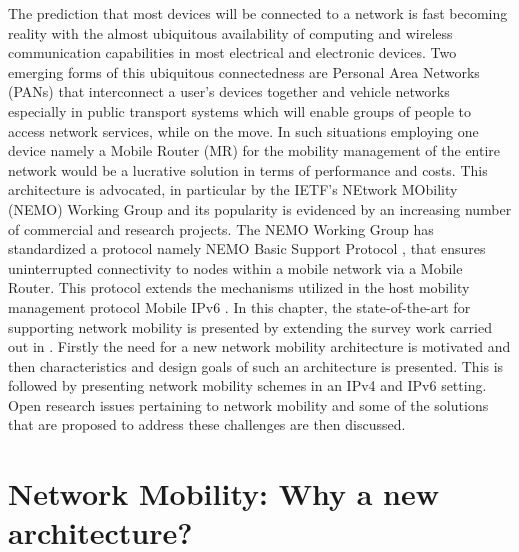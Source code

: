 The prediction that most devices will be connected to a network is fast
becoming reality with the almost ubiquitous availability of computing and
wireless communication capabilities in most electrical and electronic devices.
Two emerging forms of this ubiquitous connectedness are Personal Area Networks
(PANs) that interconnect a user's devices together and vehicle networks
especially in public transport systems which will enable groups of people to
access network services, while on the move. In such situations employing one
device namely a Mobile Router (MR) \cite{1} for the mobility management of the entire
network would be a lucrative solution in terms of performance and costs. This
architecture is advocated, in particular by the IETF's NEtwork MObility (NEMO)
Working Group \cite{2} and its popularity is evidenced by an increasing number of
commercial and research projects. The NEMO Working Group has standardized a
protocol namely NEMO Basic Support Protocol \cite{3}, that ensures uninterrupted
connectivity to nodes within a mobile network via a Mobile Router. This
protocol extends the mechanisms utilized in the host mobility management
protocol Mobile IPv6 \cite{4}.
In this chapter, the state-of-the-art for supporting network mobility is
presented by extending the survey work carried out in \cite{5}. Firstly the need for
a new network mobility architecture is motivated and then characteristics and
design goals of such an architecture is presented. This is followed by
presenting network mobility schemes in an IPv4 and IPv6 setting. Open research issues
pertaining to network mobility and some of the solutions that are proposed to
address these challenges are then discussed.

\section{Network Mobility: Why a new architecture?}

